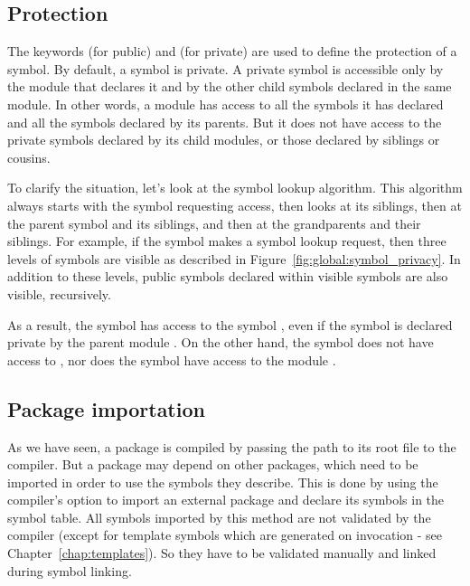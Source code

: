 \subsection{Protection}
\label{sec:global:symbol_protection}

The keywords  (for public) and  (for private) are used
to define the protection of a symbol. By default, a symbol is private. A private
symbol is accessible only by the module that declares it and by the other child
symbols declared in the same module. In other words, a module has access to all
the symbols it has declared and all the symbols declared by its parents. But it
does not have access to the private symbols declared by its child modules, or
those declared by siblings or cousins.

To clarify the situation, let's look at the symbol lookup algorithm. This
algorithm always starts with the symbol requesting access, then looks at its
siblings, then at the parent symbol and its siblings, and then at the
grandparents and their siblings. For example, if the symbol
 makes a symbol lookup request, then three levels
of symbols are visible as described in Figure~\ref{fig:global:symbol_privacy}. In
addition to these levels, public symbols declared within visible symbols are
also visible, recursively.



As a result, the symbol  has access to the symbol
, even if the symbol  is declared
private by the parent module . On the other hand, the symbol
 does not have access to
, nor does the symbol  have access to
the module .

\subsection{Package importation}

As we have seen, a package is compiled by passing the path to its root file to
the compiler. But a package may depend on other packages, which need to be
imported in order to use the symbols they describe. This is done by using the
compiler's  option to import an external package and declare its
symbols in the symbol table. All symbols imported by this method are not
validated by the compiler (except for template symbols which are generated on
invocation - see Chapter~\ref{chap:templates}). So they have to be validated
manually and linked during symbol linking.

